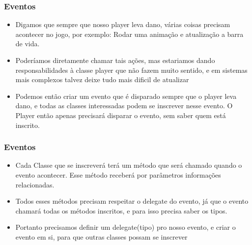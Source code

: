 \documentclass{beamer}
\begin{document}
	\begin{frame}
		\frametitle{Eventos}

		\begin{itemize}
			\item Digamos que sempre que nosso player leva dano, várias coisas
				precisam acontecer no jogo, por exemplo: Rodar uma animação e
				atualização a barra de vida.

			\item Poderíamos diretamente chamar tais ações, mas estariamos
				dando responsabilidades à classe player que não fazem muito
				sentido, e em sistemas mais complexos talvez deixe tudo mais
				dificil de atualizar

			\item Podemos então criar um evento que é disparado sempre que o
				player leva dano, e todas as classes interessadas podem se
				inscrever nesse evento. O Player então apenas precisará
				disparar o evento, sem saber quem está inscrito.
		\end{itemize}
	\end{frame}

	\begin{frame}
		\frametitle{Eventos}

		\begin{itemize}
			\item Cada Classe que se inscreverá terá um método que será chamado
				quando o evento acontecer. Esse método receberá por parâmetros
				informações relacionadas.

			\item Todos esses métodos precisam respeitar o delegate do evento,
				já que o evento chamará todas os métodos inscritos, e para isso
				precisa saber os tipos.

			\item Portanto precisamos definir um delegate(tipo) pro nosso
				evento, e criar o evento em si, para que outras classes possam
				se inscrever
		\end{itemize}

	\end{frame}
\end{document}
